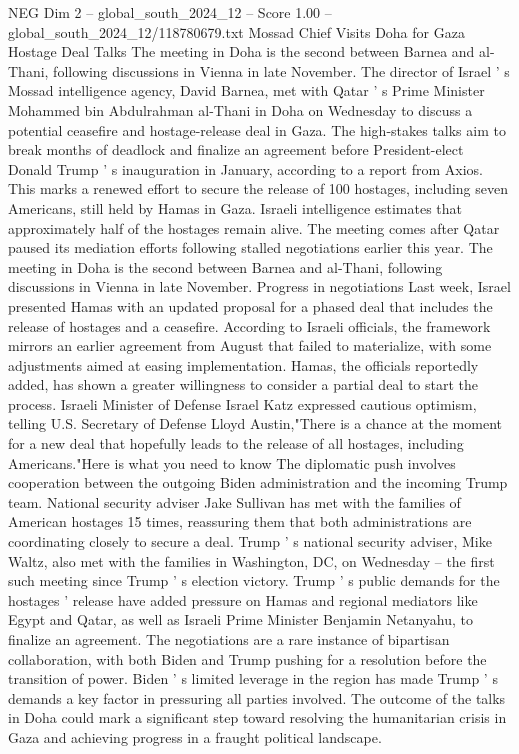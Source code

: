 \begin{textsample}{NEG Dim 2 – global\_south\_2024\_12 – Score 1.00 – global\_south\_2024\_12/118780679.txt}  \label{ex:f2_neg_387}
Mossad Chief Visits Doha for Gaza Hostage Deal Talks The meeting in Doha is the second between Barnea and al-Thani, following discussions in Vienna in late November.
The director of Israel ' s Mossad intelligence agency, David Barnea, met with Qatar ' s Prime Minister Mohammed bin Abdulrahman al-Thani in Doha on Wednesday to discuss a potential ceasefire and hostage-release deal in Gaza.
The high-stakes talks aim to break months of deadlock and finalize an agreement before President-elect Donald Trump ' s inauguration in January, according to a report from Axios.
This marks a renewed effort to secure the release of 100 hostages, including seven Americans, still held by Hamas in Gaza.
Israeli intelligence estimates that approximately half of the hostages remain alive.
The meeting comes after Qatar paused its mediation efforts following stalled negotiations earlier this year.
The meeting in Doha is the second between Barnea and al-Thani, following discussions in Vienna in late November.
Progress in negotiations Last week, Israel presented Hamas with an updated proposal for a phased deal that includes the release of hostages and a ceasefire.
According to Israeli officials, the framework mirrors an earlier agreement from August that failed to materialize, with some adjustments aimed at easing implementation.
Hamas, the officials reportedly added, has shown a greater willingness to consider a partial deal to start the process.
Israeli Minister of Defense Israel Katz expressed cautious optimism, telling U.S.
Secretary of Defense Lloyd Austin,"There is a chance at the moment for a new deal that hopefully leads to the release of all hostages, including Americans."Here is what you need to know The diplomatic push involves cooperation between the outgoing Biden administration and the incoming Trump team.
National security adviser Jake Sullivan has met with the families of American hostages 15 times, reassuring them that both administrations are coordinating closely to secure a deal.
Trump ' s national security adviser, Mike Waltz, also met with the families in Washington, DC, on Wednesday -- the first such meeting since Trump ' s election victory.
Trump ' s public demands for the hostages ' release have added pressure on Hamas and regional mediators like Egypt and Qatar, as well as Israeli Prime Minister Benjamin Netanyahu, to finalize an agreement.
The negotiations are a rare instance of bipartisan collaboration, with both Biden and Trump pushing for a resolution before the transition of power.
Biden ' s limited leverage in the region has made Trump ' s demands a key factor in pressuring all parties involved.
The outcome of the talks in Doha could mark a significant step toward resolving the humanitarian crisis in Gaza and achieving progress in a fraught political landscape.

\end{textsample}
